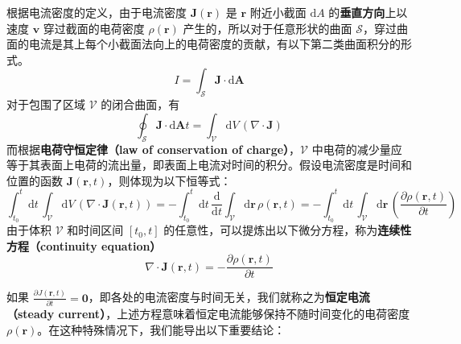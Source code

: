 \documentclass[cn,10pt,math=newtx,citestyle=gb7714-2015,bibstyle=gb7714-2015]{elegantbook}
\def\bm{\boldsymbol}
\def\mc{\mathcal}
\def\d{\mathrm d}
\def\p{\partial}
\begin{document}
根据电流密度的定义，由于电流密度 $\bm J(\bm r)$ 是 $\bm r$ 附近小截面 $\d A$ 的\textbf{垂直方向}上以速度 $\bm v$ 穿过截面的电荷密度 $\rho(\bm r)$ 产生的，所以对于任意形状的曲面 $\mc S$，穿过曲面的电流是其上每个小截面法向上的电荷密度的贡献，有以下第二类曲面积分的形式。
\begin{equation*}
    I = \int_{\mc S}\bm J\cdot\bm{\d A}
\end{equation*}
对于包围了区域 $\mc V$ 的闭合曲面，有
\begin{equation*}
    \oint_{\mc S}\bm J\cdot\bm{\d A}t = \int_{\mc V}\d V\,(\nabla\cdot\bm J)
\end{equation*}
而根据\textbf{电荷守恒定律（law of conservation of charge）}，$\mc V$ 中电荷的减少量应等于其表面上电荷的流出量，即表面上电流对时间的积分。假设电流密度是时间和位置的函数 $\bm J(\bm r,t)$，则体现为以下恒等式：
\begin{equation*}
    \int_{t_0}^t\d t\,\int_{\mc V}\d V\,(\nabla\cdot\bm J(\bm r,t)) = -\int_{t_0}^t\d t\,\frac{\d}{\d t}\int_{\mc V}\d\bm r\,\rho(\bm r,t)=-\int_{t_0}^t\d t\,\int_{\mc V}\d\bm r\,\left(\frac{\p\rho(\bm r,t)}{\p t}\right)
\end{equation*}
由于体积 $\mc V$ 和时间区间 $[t_0,t]$ 的任意性，可以提炼出以下微分方程，称为\textbf{连续性方程（continuity equation）}
\begin{equation}\label{eq:cntnty}
    \nabla\cdot\bm J(\bm r,t) = -\frac{\p\rho(\bm r,t)}{\p t}
\end{equation}

如果 $\frac{\p J(\bm r,t)}{\p t} =\bm 0$，即各处的电流密度与时间无关，我们就称之为\textbf{恒定电流（steady current）}，上述方程意味着恒定电流能够保持不随时间变化的电荷密度 $\rho(\bm r)$。在这种特殊情况下，我们能导出以下重要结论：
\end{document}
